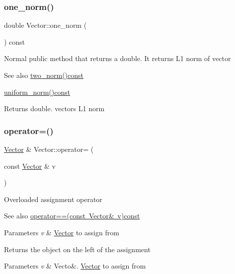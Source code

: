 \subsubsection{\texorpdfstring{one\+\_\+norm()}{one\_norm()}}
{\footnotesize\ttfamily double Vector\+::one\+\_\+norm (\begin{DoxyParamCaption}{ }\end{DoxyParamCaption}) const}

Normal public method that returns a double. It returns L1 norm of vector \begin{DoxySeeAlso}{See also}
\mbox{\hyperlink{classVector_a4f501290a50d057bb6c57ea64d7e70a4}{two\+\_\+norm()const}} 

\mbox{\hyperlink{classVector_a50b72131eaf3698a9876d99ab6912a32}{uniform\+\_\+norm()const}} 
\end{DoxySeeAlso}
\begin{DoxyReturn}{Returns}
double. vectors L1 norm 
\end{DoxyReturn}
\mbox{\label{classVector_ae48c467a9f65d60e2f7455aba4ca1239}} 
\subsubsection{\texorpdfstring{operator=()}{operator=()}}
{\footnotesize\ttfamily \mbox{\hyperlink{classVector}{Vector}} \& Vector\+::operator= (\begin{DoxyParamCaption}\item[{const \mbox{\hyperlink{classVector}{Vector}} \&}]{v }\end{DoxyParamCaption})}

Overloaded assignment operator \begin{DoxySeeAlso}{See also}
\mbox{\hyperlink{classVector_ade5fbd0cd01b034d1907e0c93433320c}{operator==(const Vector\& v)const}} 
\end{DoxySeeAlso}

\begin{DoxyParams}{Parameters}
{\em v} & \mbox{\hyperlink{classVector}{Vector}} to assign from \\
\hline
\end{DoxyParams}
\begin{DoxyReturn}{Returns}
the object on the left of the assignment 
\end{DoxyReturn}

\begin{DoxyParams}{Parameters}
{\em v} & Vecto\&. \mbox{\hyperlink{classVector}{Vector}} to assign from \\
\hline
\end{DoxyParams}
\mbox{\label{classVector_ade5fbd0cd01b034d1907e0c93433320c}} 
